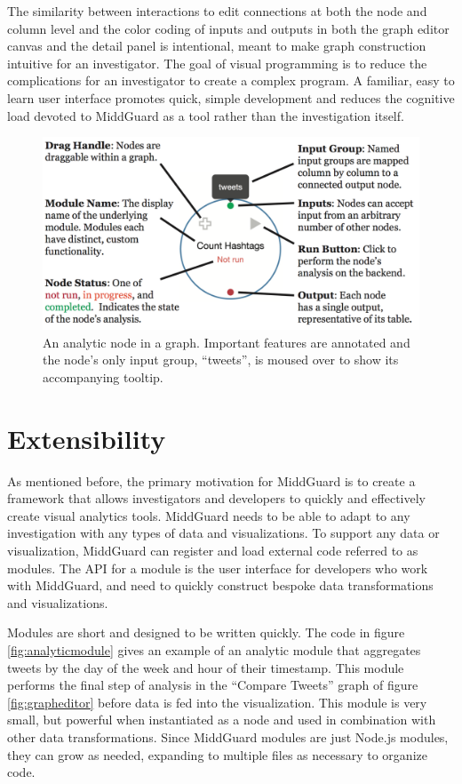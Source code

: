 \documentclass[midd]{thesis}
\begin{document}
The similarity between interactions to edit connections at both the node and
column level and the color coding of inputs and outputs in both the graph editor
canvas and the detail panel is intentional, meant to make graph construction
intuitive for an investigator. The goal of visual programming is to reduce the
complications for an investigator to create a complex program. A familiar, easy
to learn user interface promotes quick, simple development and reduces the
cognitive load devoted to MiddGuard as a tool rather than the investigation
itself.

\begin{figure}[!ht]
  \centering
  \includegraphics[width=1\textwidth]{middguard-analytic-node-annotated}
  \caption{An analytic node in a graph. Important features are annotated and the
  node's only input group, ``tweets'', is moused over to show its accompanying
  tooltip.}
  \label{fig:annotatednode}
\end{figure}

\section{Extensibility}

As mentioned before, the primary motivation for MiddGuard is to create a
framework that allows investigators and developers to quickly and effectively
create visual analytics tools. MiddGuard needs to be able to adapt to any
investigation with any types of data and visualizations. To support any data or
visualization, MiddGuard can register and load external code referred to as
modules. The API for a module is the user interface for developers who work with
MiddGuard, and need to quickly construct bespoke data transformations and
visualizations.

Modules are short and designed to be written quickly. The code in figure
\ref{fig:analyticmodule} gives an example of an analytic module that aggregates
tweets by the day of the week and hour of their timestamp. This module performs
the final step of analysis in the ``Compare Tweets'' graph of figure
\ref{fig:grapheditor} before data is fed into the visualization. This module is
very small, but powerful when instantiated as a node and used in combination
with other data transformations. Since MiddGuard modules are just Node.js
modules, they can grow as needed, expanding to multiple files as necessary to
organize code.
\end{document}
